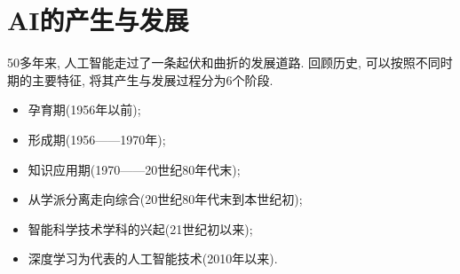 %
\section{AI的产生与发展}

50多年来, 人工智能走过了一条起伏和曲折的发展道路. 回顾历史, 可以按照不同时期的主要特征, 将其产生与发展过程分为6个阶段.
\begin{itemize}
\item 孕育期(1956年以前);
\item 形成期(1956——1970年);
\item 知识应用期(1970——20世纪80年代末);
\item 从学派分离走向综合(20世纪80年代末到本世纪初);
\item 智能科学技术学科的兴起(21世纪初以来);
\item 深度学习为代表的人工智能技术(2010年以来).
\end{itemize}
